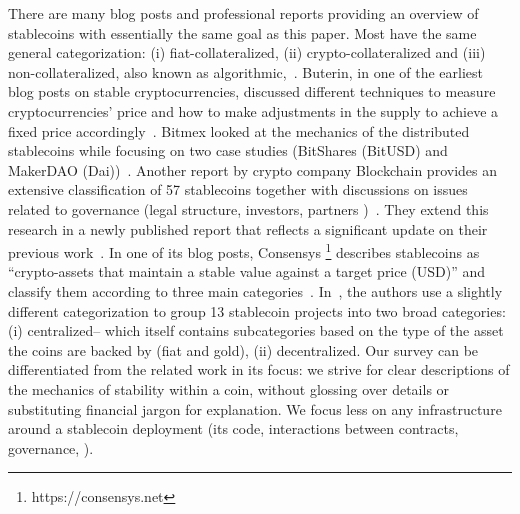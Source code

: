 There are many blog posts and professional reports providing an overview of stablecoins with essentially the same goal as this paper. Most have the same general categorization: (i) fiat-collateralized, (ii) crypto-collateralized and (iii) non-collateralized, also known as algorithmic,\eg~\cite{hackernoon, comprehensiveOverview, linkedin}. Buterin, in one of the earliest blog posts on stable cryptocurrencies, discussed different techniques to measure cryptocurrencies' price and how to make adjustments in the supply to achieve a fixed price accordingly~\cite{TheSearc7:online}. Bitmex looked at the mechanics of the distributed stablecoins while focusing on two case studies (\ie BitShares (BitUSD) and MakerDAO (Dai))~\cite{bitmex}. Another report by crypto company Blockchain provides an extensive classification of 57 stablecoins together with discussions on issues related to governance (\eg legal structure, investors, partners \etc)~\cite{reportone}. They extend this research in a newly published report that reflects a significant update on their previous work~\cite{reporttwo}. In one of its blog posts, Consensys \footnote{https://consensys.net} describes stablecoins as ``crypto-assets that maintain a stable value against a target price (\eg USD)'' and classify them according to three main categories~\cite{StateofS96:online}. In~\cite{cryptoinsider}, the authors use a slightly different categorization to group 13 stablecoin projects into two broad categories: (i) centralized-- which itself contains subcategories based on the type of the asset the coins are backed by (\eg fiat and gold), (ii) decentralized. Our survey can be differentiated from the related work in its focus: we strive for clear descriptions of the mechanics of stability within a coin, without glossing over details or substituting financial jargon for explanation. We focus less on any infrastructure around a stablecoin deployment (\eg its code, interactions between contracts, governance, \etc).




